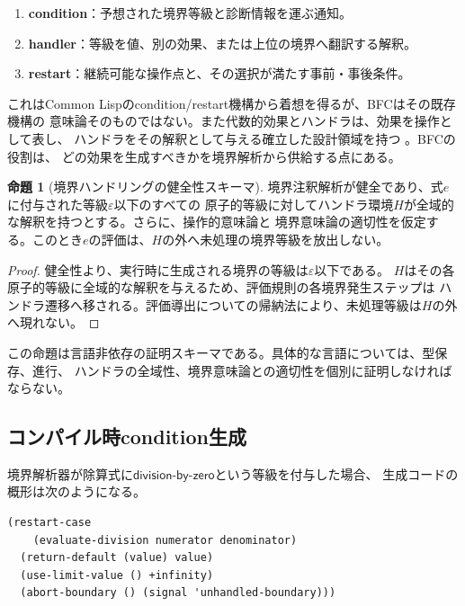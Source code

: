 \documentclass[11pt,a4paper]{ltjsarticle}
\theoremstyle{definition}
\newtheorem{proposition}[definition]{命題}
\theoremstyle{remark}
\begin{document}
\begin{enumerate}
 \item \textbf{condition}：予想された境界等級と診断情報を運ぶ通知。
 \item \textbf{handler}：等級を値、別の効果、または上位の境界へ翻訳する解釈。
 \item \textbf{restart}：継続可能な操作点と、その選択が満たす事前・事後条件。
\end{enumerate}

これはCommon Lispのcondition/restart機構から着想を得るが、BFCはその既存機構の
意味論そのものではない。また代数的効果とハンドラは、効果を操作として表し、
ハンドラをその解釈として与える確立した設計領域を持つ
\cite{BrachthaeuserEtAl2018,VanDenBergSchrijvers2023}。BFCの役割は、
どの効果を生成すべきかを境界解析から供給する点にある。

\begin{proposition}[境界ハンドリングの健全性スキーマ]
境界注釈解析が健全であり、式$e$に付与された等級$\varepsilon$以下のすべての
原子的等級に対してハンドラ環境$H$が全域的な解釈を持つとする。さらに、操作的意味論と
境界意味論の適切性を仮定する。このとき$e$の評価は、$H$の外へ未処理の境界等級を放出しない。
\end{proposition}

\begin{proof}
健全性より、実行時に生成される境界の等級は$\varepsilon$以下である。
$H$はその各原子的等級に全域的な解釈を与えるため、評価規則の各境界発生ステップは
ハンドラ遷移へ移される。評価導出についての帰納法により、未処理等級は$H$の外へ現れない。
\end{proof}

この命題は言語非依存の証明スキーマである。具体的な言語については、型保存、進行、
ハンドラの全域性、境界意味論との適切性を個別に証明しなければならない。

\subsection{コンパイル時condition生成}

境界解析器が除算式に$\mathsf{division\mbox{-}by\mbox{-}zero}$という等級を付与した場合、
生成コードの概形は次のようになる。

\begin{verbatim}
(restart-case
    (evaluate-division numerator denominator)
  (return-default (value) value)
  (use-limit-value () +infinity)
  (abort-boundary () (signal 'unhandled-boundary)))
\end{verbatim}
\end{document}
